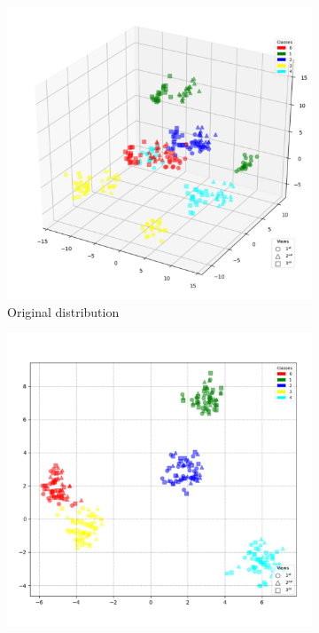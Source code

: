        \begin{figure}[htbp]
            \centering
            \begin{subfigure}{0.33\textwidth}
                \centering
                \includegraphics[width=0.95\linewidth]{figs/Synthetic2_original.png}
                \caption{Original distribution}
            \end{subfigure}%
            \begin{subfigure}{0.33\textwidth}
                \centering
                \includegraphics[width=0.95\linewidth]{figs/Synthetic2_MvDA.png}

\end{subfigure}
\end{figure}

